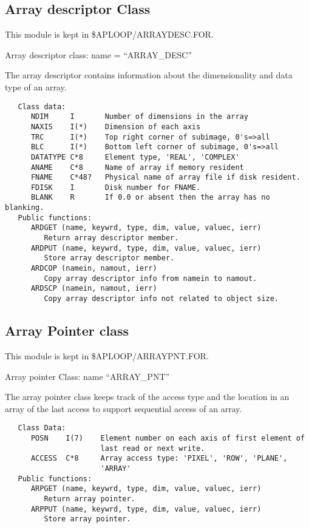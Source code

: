 \subsection{Array descriptor Class}

   This module is kept in \$APLOOP/ARRAYDESC.FOR.

   Array descriptor class: name = ``ARRAY\_DESC''

The array descriptor contains information about the dimensionality and
data type of an array.
{\small\begin{verbatim}
   Class data:
      NDIM     I       Number of dimensions in the array
      NAXIS    I(*)    Dimension of each axis
      TRC      I(*)    Top right corner of subimage, 0's=>all
      BLC      I(*)    Bottom left corner of subimage, 0's=>all
      DATATYPE C*8     Element type, 'REAL', 'COMPLEX'
      ANAME    C*8     Name of array if memory resident
      FNAME    C*48?   Physical name of array file if disk resident.
      FDISK    I       Disk number for FNAME.
      BLANK    R       If 0.0 or absent then the array has no blanking.
   Public functions:
      ARDGET (name, keywrd, type, dim, value, valuec, ierr)
         Return array descriptor member.
      ARDPUT (name, keywrd, type, dim, value, valuec, ierr)
         Store array descriptor member.
      ARDCOP (namein, namout, ierr)
         Copy array descriptor info from namein to namout.
      ARDSCP (namein, namout, ierr)
         Copy array descriptor info not related to object size.
\end{verbatim}}

\subsection{Array Pointer class}

   This module is kept in \$APLOOP/ARRAYPNT.FOR.

   Array pointer Class:  name ``ARRAY\_PNT''

The array pointer class keeps track of the access type and the
location in an array of the last access to support sequential access
of an array.
{\small\begin{verbatim}
   Class Data:
      POSN    I(7)    Element number on each axis of first element of
                      last read or next write.
      ACCESS  C*8     Array access type: 'PIXEL', 'ROW', 'PLANE',
                      'ARRAY'
   Public functions:
      ARPGET (name, keywrd, type, dim, value, valuec, ierr)
         Return array pointer.
      ARPPUT (name, keywrd, type, dim, value, valuec, ierr)
         Store array pointer.
\end{verbatim}}

